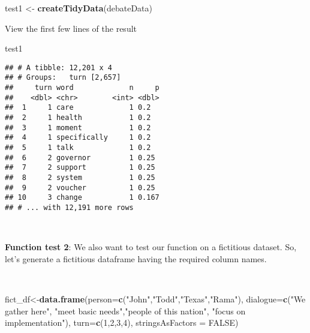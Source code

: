 \documentclass[
]{article}
\newenvironment{Shaded}{\begin{snugshade}}{\end{snugshade}}
\newcommand{\DataTypeTok}[1]{\textcolor[rgb]{0.13,0.29,0.53}{#1}}
\newcommand{\DecValTok}[1]{\textcolor[rgb]{0.00,0.00,0.81}{#1}}
\newcommand{\KeywordTok}[1]{\textcolor[rgb]{0.13,0.29,0.53}{\textbf{#1}}}
\newcommand{\NormalTok}[1]{#1}
\newcommand{\OtherTok}[1]{\textcolor[rgb]{0.56,0.35,0.01}{#1}}
\newcommand{\StringTok}[1]{\textcolor[rgb]{0.31,0.60,0.02}{#1}}
\begin{document}
\begin{Shaded}
\begin{Highlighting}[]
\NormalTok{test1 <-}\StringTok{ }\KeywordTok{createTidyData}\NormalTok{(debateData)}
\end{Highlighting}
\end{Shaded}

View the first few lines of the result

\begin{Shaded}
\begin{Highlighting}[]
\NormalTok{test1 }
\end{Highlighting}
\end{Shaded}

\begin{verbatim}
## # A tibble: 12,201 x 4
## # Groups:   turn [2,657]
##     turn word             n     p
##    <dbl> <chr>        <int> <dbl>
##  1     1 care             1 0.2  
##  2     1 health           1 0.2  
##  3     1 moment           1 0.2  
##  4     1 specifically     1 0.2  
##  5     1 talk             1 0.2  
##  6     2 governor         1 0.25 
##  7     2 support          1 0.25 
##  8     2 system           1 0.25 
##  9     2 voucher          1 0.25 
## 10     3 change           1 0.167
## # ... with 12,191 more rows
\end{verbatim}

~

\textbf{Function test 2}: We also want to test our function on a
fictitious dataset. So, let's generate a fictitious dataframe having the
required column names.

~

\begin{Shaded}
\begin{Highlighting}[]
\NormalTok{fict_df<-}\KeywordTok{data.frame}\NormalTok{(}\DataTypeTok{person=}\KeywordTok{c}\NormalTok{(}\StringTok{"John"}\NormalTok{,}\StringTok{"Todd"}\NormalTok{,}\StringTok{"Texas"}\NormalTok{,}\StringTok{"Rama"}\NormalTok{),}
\DataTypeTok{dialogue=}\KeywordTok{c}\NormalTok{(}\StringTok{"We gather here"}\NormalTok{, }\StringTok{"meet basic needs"}\NormalTok{,}\StringTok{"people of this nation"}\NormalTok{, }
\StringTok{"focus on implementation"}\NormalTok{),}
\DataTypeTok{turn=}\KeywordTok{c}\NormalTok{(}\DecValTok{1}\NormalTok{,}\DecValTok{2}\NormalTok{,}\DecValTok{3}\NormalTok{,}\DecValTok{4}\NormalTok{),}
\DataTypeTok{stringsAsFactors =} \OtherTok{FALSE}\NormalTok{)}
\end{Highlighting}
\end{Shaded}
\end{document}
